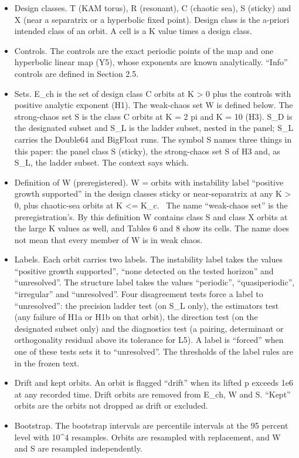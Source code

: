 \documentclass[
  11pt,
]{article}
\newcounter{none} %
\begin{document}
\begin{itemize}
  lambda\_m(n) over \{L1\} + Q. Delta\_V(n) is the same over V. R(n) =
  Delta\_V(n) / lambda\_ref (H2). n\_conv is defined in H3 (Section
  5.1); the series are stored at recorded values of n, so n\_conv takes
  recorded values of n.~
\item
  Design classes. T (KAM torus), R (resonant), C (chaotic sea), S
  (sticky) and X (near a separatrix or a hyperbolic fixed point). Design
  class is the a-priori intended class of an orbit. A cell is a K value
  times a design class.
\item
  Controls. The controls are the exact periodic points of the map and
  one hyperbolic linear map (Y5), whose exponents are known
  analytically. ``Info'' controls are defined in Section 2.5.
\item
  Sets. E\_ch is the set of design class C orbits at K \textgreater{} 0
  plus the controls with positive analytic exponent (H1). The weak-chaos
  set W is defined below. The strong-chaos set S is the class C orbits
  at K = 2 pi and K = 10 (H3). S\_D is the designated subset and S\_L is
  the ladder subset, nested in the panel; S\_L carries the Double64 and
  BigFloat runs. The symbol S names three things in this paper: the
  panel class S (sticky), the strong-chaos set S of H3 and, as S\_L, the
  ladder subset. The context says which.
\item
  Definition of W (preregistered). W = orbits with instability label
  ``positive growth supported'' in the design classes sticky or
  near-separatrix at any K \textgreater{} 0, plus chaotic-sea orbits at
  K \textless= K\_c.~ The name ``weak-chaos set'' is the
  preregistration's. By this definition W contains class S and class X
  orbits at the large K values as well, and Tables 6 and 8 show its
  cells. The name does not mean that every member of W is in weak chaos.
\item
  Labels. Each orbit carries two labels. The instability label takes the
  values ``positive growth supported'', ``none detected on the tested
  horizon'' and ``unresolved''. The structure label takes the values
  ``periodic'', ``quasiperiodic'', ``irregular'' and ``unresolved''.
  Four disagreement tests force a label to ``unresolved'': the precision
  ladder test (on S\_L only), the estimators test (any failure of H1a or
  H1b on that orbit), the direction test (on the designated subset only)
  and the diagnostics test (a pairing, determinant or orthogonality
  residual above its tolerance for L5). A label is ``forced'' when one
  of these tests sets it to ``unresolved''. The thresholds of the label
  rules are in the frozen text.
\item
  Drift and kept orbits. An orbit is flagged ``drift'' when its lifted
  \textbar p\textbar{} exceeds 1e6 at any recorded time. Drift orbits
  are removed from E\_ch, W and S. ``Kept'' orbits are the orbits not
  dropped as drift or excluded.
\item
  Bootstrap. The bootstrap intervals are percentile intervals at the 95
  percent level with 10\^{}4 resamples. Orbits are resampled with
  replacement, and W and S are resampled independently.
\end{itemize}
\end{document}
